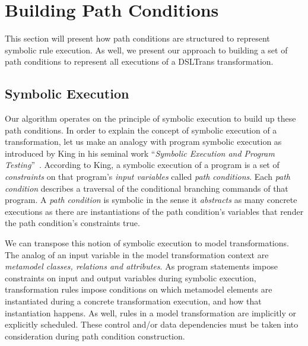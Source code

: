 \section{Building Path Conditions}
\label{sec:building_pcs}

This section will present how path conditions are structured to represent symbolic rule execution. As well, we present our approach to building a set of path conditions to represent all executions of a DSLTrans transformation.


\subsection{Symbolic Execution}

Our algorithm operates on the principle of symbolic execution to build up these
path conditions. In order to explain the concept of symbolic execution of a
transformation, let us make an analogy with program symbolic execution as
introduced by King in his seminal work ``\emph{Symbolic Execution and Program
Testing}''~\cite{DBLP:journals/cacm/King76}. According to King, a symbolic
execution of a program is a set of \emph{constraints} on that program's
\emph{input variables} called \emph{path conditions}. Each \emph{path condition}
describes a traversal of the conditional branching commands of that program. A
\emph{path condition} is symbolic in the sense it \emph{abstracts} as many
concrete executions as there are instantiations of the path condition's
variables that render the path condition's constraints true.

We can transpose this notion of symbolic execution to model transformations. The
analog of an input variable in the model transformation context are
\emph{metamodel classes, relations and attributes}. As program statements impose
constraints on input and output variables during symbolic execution,
transformation rules impose conditions on which metamodel elements are
instantiated during a concrete transformation execution, and how that
instantiation happens. As well, rules in a model transformation are implicitly
or explicitly scheduled. These control and/or data dependencies must be
taken into consideration during path condition construction.

